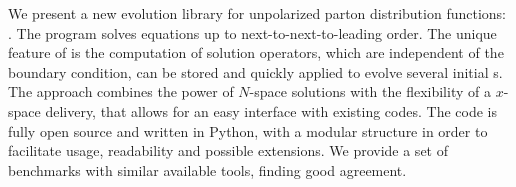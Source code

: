 We present a new \qcd{} evolution library for unpolarized parton
distribution functions: \eko{}.
The program solves \dglap{} equations up to next-to-next-to-leading order.
The unique feature of \eko{} is the computation of solution operators,
which are independent of the boundary condition, can be stored
and quickly applied to evolve several initial \pdf{}s.
The \eko{} approach combines the power of $N$-space solutions with the
flexibility of a $x$-space delivery, that allows for an easy
interface with existing codes.
The code is fully open source and written in Python, with a modular
structure in order to facilitate usage, readability and possible
extensions.
We provide a set of benchmarks with similar available tools, finding good
agreement.
